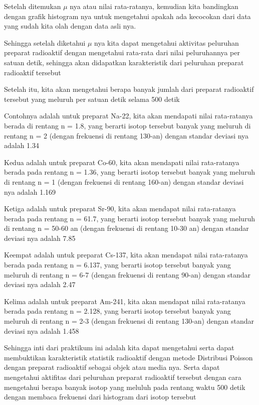 \documentclass{article}
\begin{document}
		\par Setelah ditemukan $\mu$ nya atau nilai rata-ratanya, kemudian kita bandingkan dengan grafik histogram nya untuk mengetahui apakah ada kecocokan dari data yang sudah kita olah dengan data asli nya.
		
		\par Sehingga setelah diketahui $\mu$ nya kita dapat mengetahui aktivitas peluruhan preparat radioaktif dengan mengetahui rata-rata dari nilai peluruhannya per satuan detik, sehingga akan didapatkan karakteristik dari peluruhan preparat radioaktif tersebut
		
		\par Setelah itu, kita akan mengetahui berapa banyak jumlah dari preparat radioaktif tersebut yang meluruh per satuan detik selama 500 detik
		
		\par Contohnya adalah untuk preparat Na-22, kita akan mendapati nilai rata-ratanya berada di rentang n = 1.8, yang berarti isotop tersebut banyak yang meluruh di rentang n = 2 (dengan frekuensi di rentang 130-an) dengan standar deviasi nya adalah 1.34
		
		\par Kedua adalah untuk preparat Co-60, kita akan mendapati nilai rata-ratanya berada pada rentang n = 1.36, yang berarti isotop tersebut banyak yang meluruh di rentang n = 1 (dengan frekuensi di rentang 160-an) dengan standar deviasi nya adalah 1.169
		
		\par Ketiga adalah untuk preparat Sr-90, kita akan mendapat nilai rata-ratanya berada pada rentang n = 61.7, yang berarti isotop tersebut banyak yang meluruh di rentang n = 50-60 an (dengan frekuensi di rentang 10-30 an) dengan standar deviasi nya adalah 7.85
		
		\par Keempat adalah untuk preparat Cs-137, kita akan mendapat nilai rata-ratanya berada pada rentang n = 6.137, yang berarti isotop tersebut banyak yang meluruh di rentang n = 6-7 (dengan frekuensi di rentang 90-an) dengan standar deviasi nya adalah 2.47
		
		\par Kelima adalah untuk preparat Am-241, kita akan mendapat nilai rata-ratanya berada pada rentang n = 2.128, yang berarti isotop tersebut banyak yang meluruh di rentang n = 2-3 (dengan frekuensi di rentang 130-an) dengan standar deviasi nya adalah 1.458
		
		\par Sehingga inti dari praktikum ini adalah kita dapat mengetahui serta dapat membuktikan karakteristik statistik radioaktif dengan metode Distribusi Poisson dengan preparat radioaktif sebagai objek atau media nya. Serta dapat mengetahui aktifitas dari peluruhan preparat radioaktif tersebut dengan cara mengetahui berapa banyak isotop yang meluluh pada rentang waktu 500 detik dengan membaca frekuensi dari histogram dari isotop tersebut
	
\end{document}

